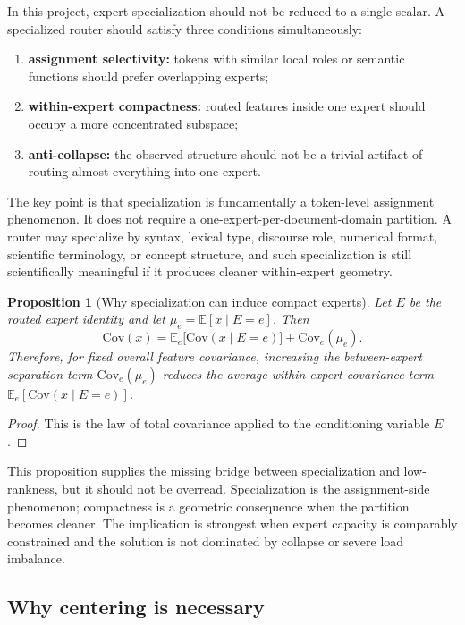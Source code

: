 \documentclass[11pt]{article}
\newtheorem{proposition}{Proposition}
\begin{document}
In this project, expert specialization should not be reduced to a single scalar. A specialized router should satisfy three conditions simultaneously:
\begin{enumerate}
    \item \textbf{assignment selectivity:} tokens with similar local roles or semantic functions should prefer overlapping experts;
    \item \textbf{within-expert compactness:} routed features inside one expert should occupy a more concentrated subspace;
    \item \textbf{anti-collapse:} the observed structure should not be a trivial artifact of routing almost everything into one expert.
\end{enumerate}

The key point is that specialization is fundamentally a token-level assignment phenomenon. It does not require a one-expert-per-document-domain partition. A router may specialize by syntax, lexical type, discourse role, numerical format, scientific terminology, or concept structure, and such specialization is still scientifically meaningful if it produces cleaner within-expert geometry.

\begin{proposition}[Why specialization can induce compact experts]
Let $E$ be the routed expert identity and let $\mu_e=\mathbb{E}[x\mid E=e]$. Then
\[
\mathrm{Cov}(x)
=
\mathbb{E}_{e}\!\big[\mathrm{Cov}(x\mid E=e)\big]
+
\mathrm{Cov}_{e}(\mu_e).
\]
Therefore, for fixed overall feature covariance, increasing the between-expert separation term $\mathrm{Cov}_{e}(\mu_e)$ reduces the average within-expert covariance term $\mathbb{E}_{e}[\mathrm{Cov}(x\mid E=e)]$.
\end{proposition}

\begin{proof}
This is the law of total covariance applied to the conditioning variable $E$.
\end{proof}

This proposition supplies the missing bridge between specialization and low-rankness, but it should not be overread. Specialization is the assignment-side phenomenon; compactness is a geometric consequence when the partition becomes cleaner. The implication is strongest when expert capacity is comparably constrained and the solution is not dominated by collapse or severe load imbalance.

\subsection{Why centering is necessary}
\end{document}
